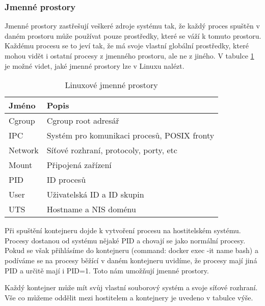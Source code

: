 
\subsubsection{Jmenné prostory}

Jmenné prostory zastřešují veškeré zdroje systému tak, že každý proces spuštěn v daném prostoru může používat pouze prostředky, které se váží k tomuto prostoru. Každému procesu se to jeví tak, že má svoje vlastní globální prostředky, které mohou vidět i ostatní procesy z jmenného prostoru, ale ne z jiného. V tabulce \ref{tab:Jmenne prostory} je možné videt, jaké jmenné prostory lze v Linuxu nalézt.

\begin{table}[h!]
  \begin{center}
	\caption{Linuxové jmenné prostory}
    \label{tab:Jmenne prostory}
    \begin{tabular}{|l|l|} 
    	  \hline
      \textbf{Jméno} & \textbf{Popis} \\
      \hline

	  Cgroup  &  Cgroup root adresář\\
	  IPC     &  Systém pro komunikaci procesů, POSIX fronty\\
	  Network &  Síťové rozhraní, protocoly, porty, etc\\
      Mount   &  Připojená zařízení\\
      PID     &  ID procesů\\
      User    &  Uživatelská ID a ID skupin\\
      UTS     &  Hostname a NIS doménu\\   
      
      \hline
    \end{tabular}
  \end{center}
\end{table}

Při spuštění kontejneru dojde k vytvoření procesu na hostitelském systému. Procesy dostanou od systému nějaké PID a chovají se jako normální procesy. Pokud se však přihlásíme do kontejneru (command: docker exec -it name bash) a podíváme se na procesy běžící v daném kontejneru uvidíme, že procesy mají jiná PID a určitě mají i PID=1. Toto nám umožňují jmenné prostory.

Každý kontejner může mít svůj vlastní souborový systém a svoje síťové rozhraní. Vše co můžeme oddělit mezi hostitelem a kontejnery je uvedeno v tabulce výše. 

